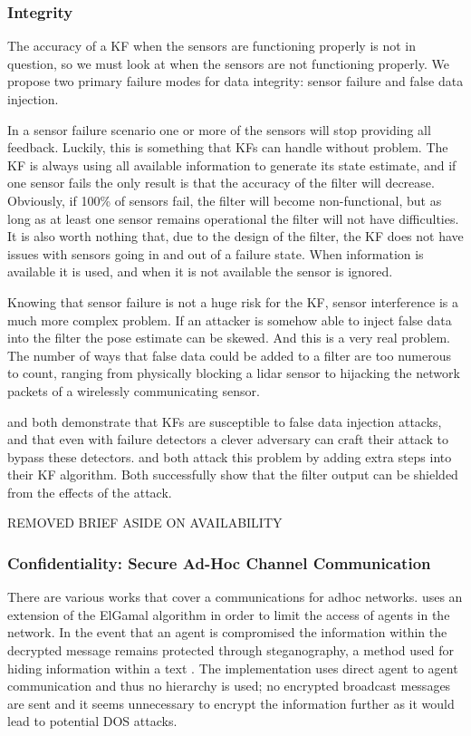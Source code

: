 \documentclass[conference]{IEEEtran}
\begin{document}
\subsubsection{Integrity}
The accuracy of a KF when the sensors are functioning properly is not in question, so we must look at when the sensors are not functioning properly. We propose two primary failure modes for data integrity: sensor failure and false data injection.

In a sensor failure scenario one or more of the sensors will stop providing all feedback. Luckily, this is something that KFs can handle without problem. The KF is always using all available information to generate its state estimate, and if one sensor fails the only result is that the accuracy of the filter will decrease. Obviously, if 100\% of sensors fail, the filter will become non-functional, but as long as at least one sensor remains operational the filter will not have difficulties. It is also worth nothing that, due to the design of the filter, the KF does not have issues with sensors going in and out of a failure state. When information is available it is used, and when it is not available the sensor is ignored.

Knowing that sensor failure is not a huge risk for the KF, sensor interference is a much more complex problem. If an attacker is somehow able to inject false data into the filter the pose estimate can be skewed. And this is a very real problem. The number of ways that false data could be added to a filter are too numerous to count, ranging from physically blocking a lidar sensor to hijacking the network packets of a wirelessly communicating sensor.

\cite{Mo2010} and \cite{Yang2013} both demonstrate that KFs are susceptible to false data injection attacks, and that even with failure detectors a clever adversary can craft their attack to bypass these detectors. \cite{Bezzo_2014} and \cite{Mo2014} both attack this problem by adding extra steps into their KF algorithm. Both successfully show that the filter output can be shielded from the effects of the attack.

REMOVED BRIEF ASIDE ON AVAILABILITY

\subsubsection{Confidentiality: Secure Ad-Hoc Channel Communication}
There are various works that cover a communications for adhoc networks. \cite{vegh2014securing} uses an extension of the ElGamal algorithm in order to limit the access of agents in the network. In the event that an agent is compromised the information within the decrypted message remains protected through steganography, a method used for hiding information within a text \cite{adi2009mechatronic}. The implementation uses direct agent to agent communication and thus no hierarchy is used; no encrypted broadcast messages are sent and it seems unnecessary to encrypt the information further as it would lead to potential DOS attacks.
\end{document}
